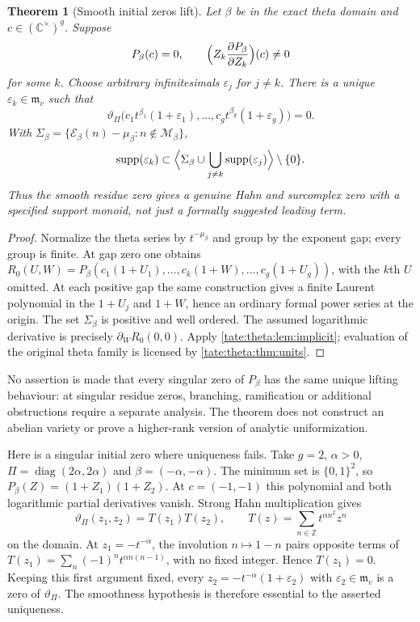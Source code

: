 \documentclass[11pt,letterpaper]{article}
\newtheorem{theorem}{Theorem}[section]
\theoremstyle{definition}
\newcommand{\C}{\mathbb C}
\newcommand{\Z}{\mathbb Z}
\newcommand{\supp}{\operatorname{supp}}
\newcommand{\m}{\mathfrak m}
\newcommand{\cE}{\mathcal E}
\newcommand{\cM}{\mathcal M}
\begin{document}
\begin{theorem}[Smooth initial zeros lift]\label{tate:theta:thm:zerolift}
Let $\beta$ be in the exact theta domain and $c\in(\C^\times)^g$. Suppose
\[
 P_\beta(c)=0,\qquad
 \Bigl(Z_k\frac{\partial P_\beta}{\partial Z_k}\Bigr)(c)\ne0
\]
for some $k$. Choose arbitrary infinitesimals $\varepsilon_j$ for $j\ne k$.
There is a unique $\varepsilon_k\in\m_v$ such that
\begin{equation}
 \vartheta_\Pi\bigl(c_1t^{\beta_1}(1+\varepsilon_1),\ldots,
                c_gt^{\beta_g}(1+\varepsilon_g)\bigr)=0.
 \label{tate:theta:eq:thetalift}
\end{equation}
With $\Sigma_\beta=\{\cE_\beta(n)-\mu_\beta:n\notin\cM_\beta\}$,
\begin{equation}
 \supp(\varepsilon_k)\subset
 \Bigl\langle\Sigma_\beta\cup\bigcup_{j\ne k}\supp(\varepsilon_j)\Bigr\rangle
 \setminus\{0\}.\label{tate:theta:eq:zerosupport}
\end{equation}
Thus the smooth residue zero gives a genuine Hahn and surcomplex zero with a
specified support monoid, not just a formally suggested leading term.
\end{theorem}

\begin{proof}
Normalize the theta series by $t^{-\mu_\beta}$ and group by the exponent
gap; every group is finite. At gap zero one obtains
$R_0(U,W)=P_\beta(c_1(1+U_1),\ldots,c_k(1+W),\ldots,c_g(1+U_g))$, with the
$k$th $U$ omitted. At each positive gap the same construction gives a
finite Laurent polynomial in the $1+U_j$ and $1+W$, hence an ordinary
formal power series at the origin. The set $\Sigma_\beta$ is positive and
well ordered. The assumed logarithmic derivative is precisely
$\partial_WR_0(0,0)$. Apply \cref{tate:theta:lem:implicit}; evaluation of
the original theta family is licensed by \cref{tate:theta:thm:units}.
\end{proof}

No assertion is made that every singular zero of $P_\beta$ has the same
unique lifting behaviour: at singular residue zeros, branching,
ramification or additional obstructions require a separate analysis. The
theorem does not construct an abelian variety or prove a higher-rank
version of analytic uniformization.

Here is a singular initial zero where uniqueness fails. Take $g=2$,
$\alpha>0$, $\Pi=\operatorname{diag}(2\alpha,2\alpha)$ and
$\beta=(-\alpha,-\alpha)$. The minimum set is $\{0,1\}^2$, so
$P_\beta(Z)=(1+Z_1)(1+Z_2)$. At $c=(-1,-1)$ this polynomial and both
logarithmic partial derivatives vanish. Strong Hahn multiplication gives
\[
 \vartheta_\Pi(z_1,z_2)=T(z_1)T(z_2),\qquad
 T(z)=\sum_{n\in\Z}t^{\alpha n^2}z^n
\]
on the domain. At $z_1=-t^{-\alpha}$, the involution $n\mapsto1-n$
pairs opposite terms of
$T(z_1)=\sum_n(-1)^nt^{\alpha n(n-1)}$, with no fixed integer.
Hence $T(z_1)=0$. Keeping this first argument fixed, every
$z_2=-t^{-\alpha}(1+\varepsilon_2)$ with $\varepsilon_2\in\m_v$
is a zero of $\vartheta_\Pi$. The smoothness hypothesis is therefore
essential to the asserted uniqueness.
\end{document}
